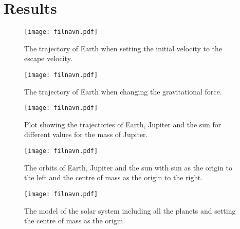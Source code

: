 \section{Results}
\label{sec:results}

\begin{figure}[htbp]
	\centering
	\texttt{[image: filnavn.pdf]}
	\caption{The trajectory of Earth when setting the initial velocity to the escape velocity.}
	\label{fig:earth escape}
\end{figure}

\begin{figure}[htbp]
	\centering
	\texttt{[image: filnavn.pdf]}
	\caption{The trajectory of Earth when changing the gravitational force.}
	\label{fig:changing beta}
\end{figure}

\begin{figure}[htbp]
	\centering
	\texttt{[image: filnavn.pdf]}
	\caption{Plot showing the trajectories of Earth, Jupiter and the sun for different values for the mass of Jupiter.}
	\label{fig:jupiter mass}
\end{figure}

\begin{figure}[htbp]
	\centering
	\texttt{[image: filnavn.pdf]}
	\caption{The orbits of Earth, Jupiter and the sun with sun as the origin to the left and the centre of mass as the origin to the right.}
	\label{fig:centre of mass}
\end{figure}

\begin{figure}[htbp]
	\centering
	\texttt{[image: filnavn.pdf]}
	\caption{The model of the solar system including all the planets and setting the centre of mass as the origin.}
	\label{fig:solar system}
\end{figure}